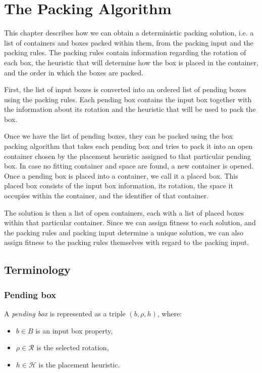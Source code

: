 \chapter{The Packing Algorithm}
\label{chap:packing}

This chapter describes how we can obtain a deterministic packing solution, i.e. a list of containers and boxes packed within them, 
from the packing input and the packing rules. The packing rules contain information regarding the rotation of each box, the heuristic that will
determine how the box is placed in the container, and the order in which the boxes are packed. 

First, the list of input boxes is converted into an ordered list of pending boxes using the packing rules.
Each pending box contains the input box together with the information about its rotation and the heuristic that will be used to pack the box. 

Once we have the list of pending boxes, they can be packed using the box packing algorithm that 
takes each pending box and tries to pack it into an open container chosen by the placement heuristic assigned to that particular pending box.
In case no fitting container and space are found, a new container is opened.
Once a pending box is placed into a container, we call it a placed box.
This placed box consists of the input box information, its rotation, the space it occupies within the container, and the identifier of that container. 

The solution is then a list of open containers, each with a list of placed boxes within that particular container.
Since we can assign fitness to each solution, and the packing rules and packing input determine a unique solution, we can also assign fitness to the packing rules themselves with regard to the packing input.

\section{Terminology}

\subsection{Pending box}

A \emph{pending box} is represented as a triple $(b, \rho, h)$, where:
\begin{itemize}
    \item $b \in B$ is an input box property,
    \item $\rho \in \mathcal{R}$ is the selected rotation,
    \item $h \in \mathcal{H}$ is the placement heuristic.
\end{itemize}

